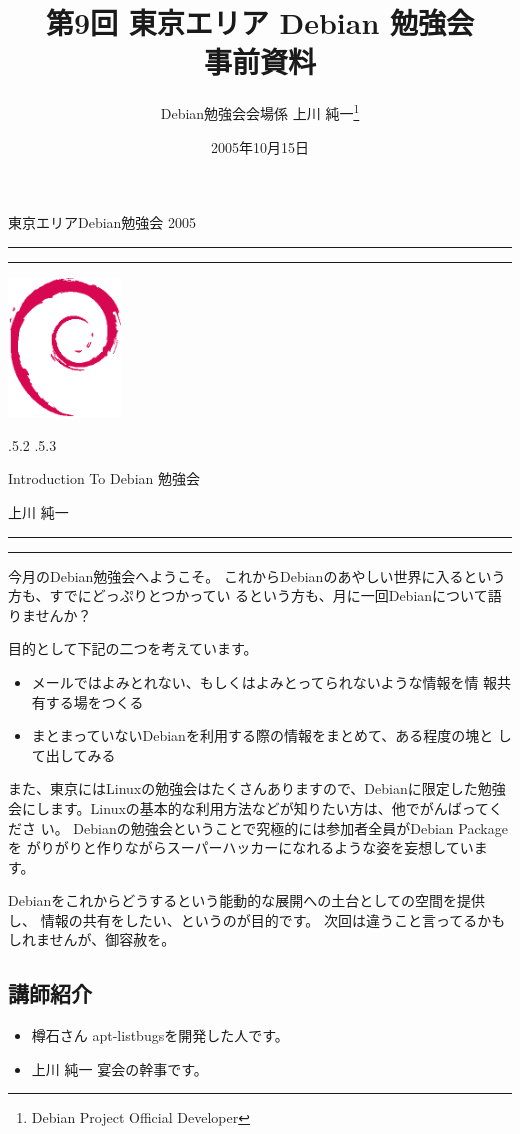 \documentclass[mingoth,a4paper]{jsarticle}
\makeatletter
\renewcommand{\section}{\@startsection{section}{1}{\z@}%
    {\Cvs \@plus.5\Cdp \@minus.2\Cdp}%
    {.5\Cvs \@plus.3\Cdp}%
    {\normalfont\Large\headfont\raggedright\centering}} %
\newcommand{\dancersection}[2]{%
\newpage
東京エリアDebian勉強会 2005
\hrule
\vspace{0.5mm}
\hrule
\hfill{}\includegraphics[width=3cm]{image200502/openlogo-nd.eps}\\
\vspace{-4cm}
\begin{center}
  \section{#1}
\end{center}
\hfill{}#2\hspace{3cm}\space\\
\hrule
\hrule
\vspace{1cm}
}
\makeatother
\begin{document}
\begin{titlepage}


\title{
 第9回 東京エリア Debian 勉強会\\事前資料}
\date{2005年10月15日}
\author{Debian勉強会会場係 上川 純一\thanks{Debian Project Official Developer}} 
\maketitle
\thispagestyle{empty}

\end{titlepage}

\newpage
\tableofcontents

\dancersection{Introduction To Debian 勉強会}{上川 純一}

今月のDebian勉強会へようこそ。
これからDebianのあやしい世界に入るという方も、すでにどっぷりとつかってい
るという方も、月に一回Debianについて語りませんか？

目的として下記の二つを考えています。

\begin{itemize}
 \item メールではよみとれない、もしくはよみとってられないような情報を情
       報共有する場をつくる
 \item まとまっていないDebianを利用する際の情報をまとめて、ある程度の塊と
       して出してみる
\end{itemize}

また、東京にはLinuxの勉強会はたくさんありますので、Debianに限定した勉強
会にします。Linuxの基本的な利用方法などが知りたい方は、他でがんばってくださ
い。
Debianの勉強会ということで究極的には参加者全員がDebian Packageを
がりがりと作りながらスーパーハッカーになれるような姿を妄想しています。

Debianをこれからどうするという能動的な展開への土台としての空間を提供し、
情報の共有をしたい、というのが目的です。
次回は違うこと言ってるかもしれませんが、御容赦を。

\subsection{講師紹介}

\begin{itemize}
 \item{樽石さん} apt-listbugsを開発した人です。
 \item{上川 純一} 宴会の幹事です。
\end{itemize}
\end{document}
